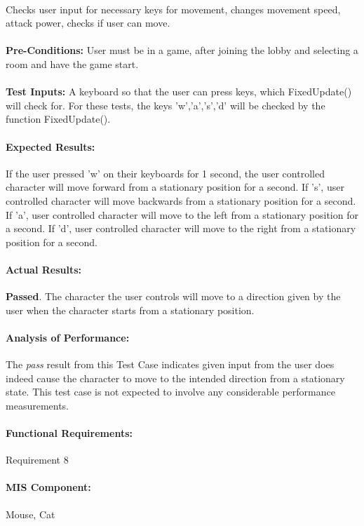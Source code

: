 \documentclass{article}
\begin{document}
    \paragraph{} Checks user input for necessary keys for movement, changes movement speed, attack power, checks if user can move.
    \paragraph{}\textbf{Pre-Conditions:} User must be in a game, after joining the lobby and selecting a room and have the game start.
    \paragraph{}\textbf{Test Inputs:} A keyboard so that the user can press keys, which FixedUpdate() will check for. For these tests, the keys 'w','a','s','d' will be checked by the function FixedUpdate(). 
    \paragraph{Expected Results:} If the user pressed 'w' on their keyboards for 1 second, the user controlled character will move forward from a stationary position for a second. If 's', user controlled character will move backwards from a stationary position for a second. If 'a', user controlled character will move to the left from a stationary position for a second. If 'd', user controlled character will move to the right from a stationary position for a second.
    \paragraph{Actual Results:} \textbf{Passed}. The character the user controls will move to a direction given by the user when the character starts from a stationary position.
    \paragraph{Analysis of Performance:} The \emph{pass} result from this Test Case indicates given input from the user does indeed cause the character to move to the intended direction from a stationary state. This test case is not expected to involve any considerable performance measurements.
    \paragraph{Functional Requirements:} Requirement 8
    \paragraph{MIS Component:} Mouse, Cat 
    
\end{document}
